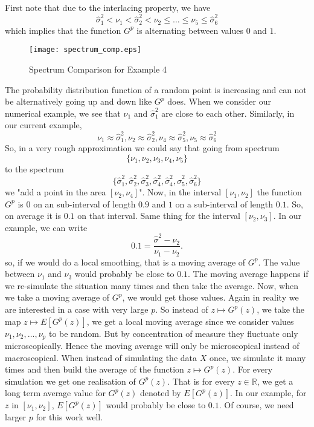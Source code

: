 \documentclass[12pt]{amsart}
\theoremstyle{definition}
\numberwithin{equation}{section}
\numberwithin{equation}{section}
\theoremstyle{remark}
\numberwithin{equation}{section}
\begin{document}
	First note that due to the interlacing property, we have
	$$\hat{\sigma}^2_1<\nu_1<\hat{\sigma}^2_2<\nu_2\leq\ldots\leq \nu_5\leq \hat{\sigma}^2_6$$
	which implies that the function $G^p$ is alternating between values $0$ and $1$.
		\begin{figure}\centering
     \label{spectrum_comp}
     \texttt{[image: spectrum\_comp.eps]}
     \caption{\small Spectrum Comparison for Example 4}
     \end{figure}
	The probability distribution function of a random point is increasing and can not be alternatively
	going up and down like $G^p$ does. When we consider our numerical example, we see that
	$\nu_1$ and $\hat{\sigma}^2_1$ are close to each other. Similarly, in our current example,
	\begin{equation}
	\nu_1\approx \hat{\sigma}^2_1,\nu_2\approx \hat{\sigma}^2_2,\nu_4\approx \hat{\sigma}^2_5,\nu_5\approx \hat{\sigma}^2_6
		\end{equation}
	So, in a very rough approximation we could say that going from spectrum
	\begin{equation}
	\label{spectrum1}
	\{\nu_1,\nu_2,\nu_3,\nu_4,\nu_5\}
	\end{equation}
	to the spectrum
	\begin{equation}
	\label{spec trum2}
	\{\hat{\sigma}^2_1,\hat{\sigma}^2_2,\hat{\sigma}^2_3,\hat{\sigma}^2_4,\hat{\sigma}^2_4,\hat{\sigma}^2_5,\hat{\sigma}^2_6\}
	\end{equation}
	we "add a point in the area $[\nu_2,\nu_4]$". Now, in the interval $[\nu_1,\nu_2]$ the function $G^p$ is 0 on an sub-interval of length $0.9$ and $1$ on a sub-interval of length
	$0.1$. So, on average it is $0.1$ on that interval. Same thing for the interval $[\nu_2,\nu_3]$. In our example, we can write
	\begin{equation}
	\label{01}
	0.1=\frac{\hat{\sigma}^2-\nu_2}{\nu_1-\nu_2}.
	\end{equation}
	so, if we would do a local smoothing, that is a moving average of $G^p$. The value between $\nu_1$ and $\nu_3$ would probably be close to $0.1$. The moving average happens if we re-simulate the situation many times and then take the average.
	Now, when we take a moving average of $G^p$, we would get those values. Again in reality we are interested in a case with very
	large $p$. So instead of $z\mapsto G^p(z)$, we take the map $z\mapsto E[G^p(z)]$, we get a local moving average since we consider values $\nu_1,\nu_2,\ldots,\nu_p$ to be random. But by concentration of measure they fluctuate only microscopically. Hence the moving average will only be microscopical instead of macroscopical. When instead of simulating the data $X$ once,
	we simulate it many times and then build the average of the function $z\mapsto G^p(z)$. For every simulation we get one realisation of $G^p(z)$. That is for every
	$z\in \mathbb{R}$, we get a long term average value for $G^p(z)$ denoted by
	$E[G^p(z)]$. In our example, for $z$ in  $[\nu_1,\nu_2]$,  $E[G^p(z)]$ would probably be close to $0.1$.
	Of course, we need larger $p$ for this work well.
	
\end{document}
